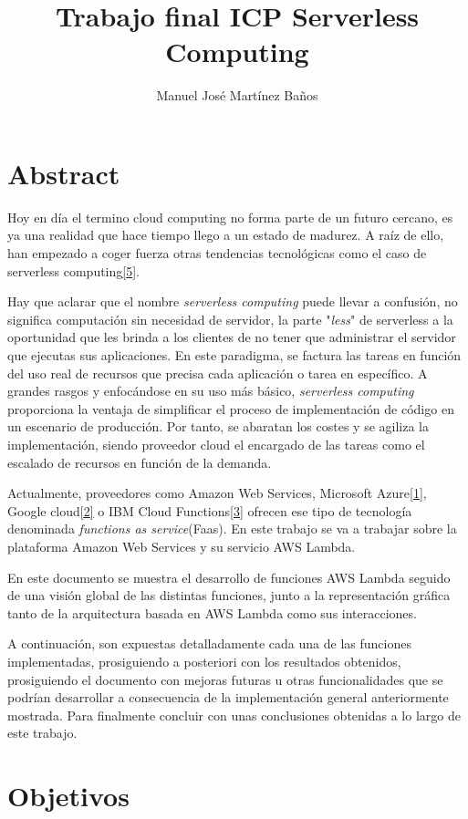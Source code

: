\documentclass[
]{article}
\title{Trabajo final ICP Serverless Computing}
\author{Manuel José Martínez Baños}
\date{}
\begin{document}
\maketitle
\tableofcontents 
\cleardoublepage %


\hypertarget{header-n2}{%
\section{Abstract}\label{header-n2}}

Hoy en día el termino cloud computing no forma parte de un futuro
cercano, es ya una realidad que hace tiempo llego a un estado de
madurez. A raíz de ello, han empezado a coger fuerza otras tendencias
tecnológicas como el caso de serverless
computing\protect\hyperlink{1}{{[}5{]}}.

Hay que aclarar que el nombre \emph{serverless computing} puede llevar a
confusión, no significa computación sin necesidad de servidor, la parte
"\emph{less}" de serverless a la oportunidad que les brinda a los
clientes de no tener que administrar el servidor que ejecutas sus
aplicaciones. En este paradigma, se factura las tareas en función del
uso real de recursos que precisa cada aplicación o tarea en específico.
A grandes rasgos y enfocándose en su uso más básico, \emph{serverless
computing} proporciona la ventaja de simplificar el proceso de
implementación de código en un escenario de producción. Por tanto, se
abaratan los costes y se agiliza la implementación, siendo proveedor
cloud el encargado de las tareas como el escalado de recursos en función
de la demanda.

Actualmente, proveedores como Amazon Web Services, Microsoft
Azure\protect\hyperlink{1}{{[}1{]}}, Google
cloud\protect\hyperlink{1}{{[}2{]}} o IBM Cloud
Functions\protect\hyperlink{1}{{[}3{]}} ofrecen ese tipo de tecnología
denominada \emph{functions as service}(Faas). En este trabajo se va a
trabajar sobre la plataforma Amazon Web Services y su servicio AWS
Lambda.

En este documento se muestra el desarrollo de funciones AWS Lambda
seguido de una visión global de las distintas funciones, junto a la
representación gráfica tanto de la arquitectura basada en AWS Lambda
como sus interacciones.

A continuación, son expuestas detalladamente cada una de las funciones
implementadas, prosiguiendo a posteriori con los resultados obtenidos,
prosiguiendo el documento con mejoras futuras u otras funcionalidades
que se podrían desarrollar a consecuencia de la implementación general
anteriormente mostrada. Para finalmente concluir con unas conclusiones
obtenidas a lo largo de este trabajo.
\newpage
\hypertarget{header-n9}{%
\section{Objetivos}\label{header-n9}}
\end{document}

